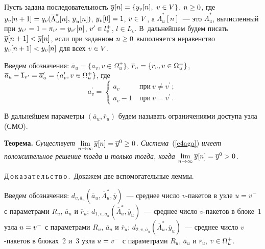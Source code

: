 \begin{multicols}{2}
    Пусть задана последовательность $\overline{y}[n]\hm=\{y_v[n],\ v\in 
V\}$, $n\hm\geq0$, где 
$y_v[n+1]\hm=q_v(\overline{\Lambda}_u^*[n],\,\overline{y}_u[n])$, 
$y_v[0]\hm=1$, $v\hm\in V$, а $\overline{\Lambda}_u^*[n]$~--- это 
$\overline{\Lambda}_u^*$, вычисленный при $y_{v^\prime} \hm=1-
\pi_{v^\prime}\hm= y_{v^\prime}[n]$, $v^\prime\hm\in l_v^+$, $l\in L_v$. 
В~дальнейшем будем писать $\overline{y}[n+1]\hm< \overline{y}[n]$, если 
при заданном $n\hm\geq 0$ выполняется неравенство $y_v[n+1]\hm< y_v[n]$ 
для всех $v\hm\in V$.
     
     Введем обозначения: $\overline{a}_u =\{ a_v, v\in\Omega_u^+\}$, 
$\overline{r}_u\hm= \{ r_v, v\hm\in \Omega_u^+\}$,
      $
      \overline{a}_u -\overline{1}_{v^\prime} \hm= \overline{a}_u^\prime = \left\{ 
a^\prime_v, v\hm\in\Omega_u^+\right\}$,
     где 
     $$
     a^\prime_v=\begin{cases}
     a_v & \ \mbox{при}\ v\not=v^\prime\,;\\
     a_v-1 & \ \mbox{при}\ v=v^\prime\,.
     \end{cases}
     $$
     
     В дальнейшем параметры $(\overline{a}_u,\overline{r}_u)$ будем 
называть ограничениями доступа узла (СМО).
     
     \medskip
     
     \noindent
     \textbf{Теорема.} \textit{Существует $\lim\limits_{n\rightarrow\infty} 
\overline{y}[n]\hm=\overline{y}^0\hm\geq 0$. Система}~(\ref{e4aga}) \textit{имеет 
положительное решение тогда и только тогда, когда 
$\lim\limits_{n\rightarrow\infty} \overline{y}[n]\hm=\overline{y}^0\hm>0$.}
     
     \medskip
     
     \noindent
     Д\,о\,к\,а\,з\,а\,т\,е\,л\,ь\,с\,т\,в\,о\,.\ Докажем две вспомогательные 
леммы.
     
     Введем обозначения: $d_{v,\overline{a}_u}\left(\overline{a}_u, 
\overline{\Lambda}_u^*,\overline{y}\right)$~--- среднее число $v$-пакетов в 
узле $u\hm=v^- $ с параметрами $R_u$, $\overline{a}_u$ и $\overline{r}_u$;  
$d_{1, v, \overline{a}_u}\left(\overline{\Lambda}_u^*, \overline{y}_u\right)$~--- среднее 
число $v$-пакетов в блоке~1 узла $u\hm=v^-$ с параметрами $R_u$, 
$\overline{a}_u$ и $\overline{r}_u$; $d_{2,v,\overline{a}_u}\left( 
\overline{\Lambda}_u^*, \overline{y}_u\right)$~--- среднее число $v$-пакетов в 
блоках~2 и~3 узла $u\hm=v^-$ с параметрами $R_u$, $\overline{a}_u$ и
$\overline{r}_u$, $v\hm\in \Omega_u^+$.
     

\end{multicols}
